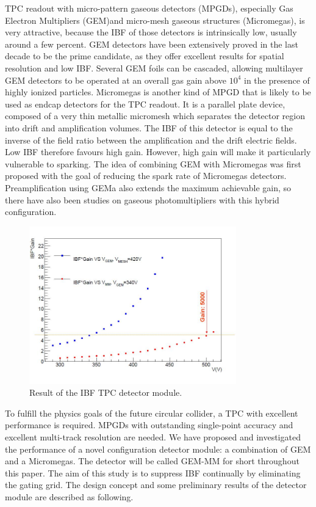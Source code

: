 TPC readout with micro-pattern gaseous detectors (MPGDs), especially Gas Electron Multipliers (GEM)and micro-mesh gaseous structures (Micromegas), is very attractive, because the IBF of those detectors is intrinsically low, usually around a few percent. GEM detectors have been extensively proved in the last decade to be the prime candidate, as they offer excellent results for spatial resolution and low IBF. Several GEM foils can be cascaded, allowing multilayer GEM detectors to be operated at an overall gas gain above $10^4$ in the presence of highly ionized particles. Micromegas is another kind of MPGD that is likely to be used as endcap detectors for the TPC readout. It is a parallel plate device, composed of a very thin metallic micromesh which
separates the detector region into drift and amplification volumes. The IBF of this detector is equal to the inverse of the field ratio between the amplification and the drift electric fields. Low IBF therefore favours high gain. However, high gain will make it particularly vulnerable
to sparking. The idea of combining GEM with Micromegas was first proposed with the goal of reducing the spark rate of Micromegas detectors. Preamplification using GEMa also extends the maximum achievable gain, so there have also been studies on gaseous photomultipliers with this hybrid configuration.

\begin{figure}[htbp]
\centering
\includegraphics[width=0.80\textwidth]{figures/TrackingSystem/TPC_IBF_dig.jpg}
\caption{\label{fig:TPC_IBF_dig} Result of the IBF TPC detector module.}
\end{figure}

To fulfill the physics goals of the future circular collider, a TPC with excellent performance is required. MPGDs with outstanding single-point accuracy and excellent multi-track resolution are needed. We have proposed and investigated the performance of a novel configuration detector module: a combination of GEM and a Micromegas. The detector will be called GEM-MM for
short throughout this paper. The aim of this study is to suppress IBF continually by eliminating the gating grid. The design concept and some preliminary results of the detector module are described as following.


